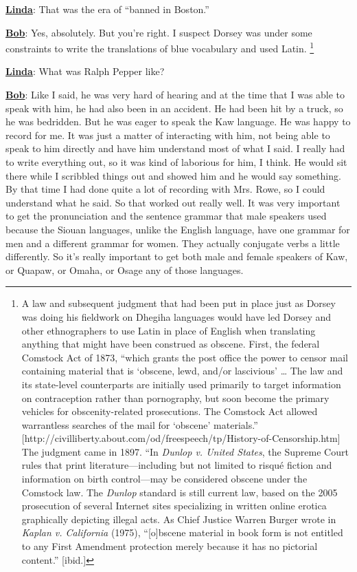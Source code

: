 \documentclass[output=paper]{LSP/langsci}
\begin{document}
\textbf{\underline{Linda}}: That was the era of ``banned in Boston.''

\textbf{\underline{Bob}}: Yes, absolutely. But you're right. I suspect Dorsey was under some constraints to write the translations of blue vocabulary and used Latin. \footnote{A law and subsequent judgment that had been put in place just as Dorsey was doing his fieldwork on Dhegiha languages would have led Dorsey and other ethnographers to use Latin in place of English when translating anything that might have been construed as obscene.  First, the federal Comstock Act of 1873, ``which grants the post office the power to censor mail containing material that is `obscene, lewd, and/or lascivious' {\ldots} The law and its state-level counterparts are initially used primarily to target information on contraception rather than pornography, but soon become the primary vehicles for obscenity-related prosecutions. The Comstock Act allowed warrantless searches of the mail for `obscene' materials.'' [{http://civilliberty.about.com/od/freespeech/tp/History-of-Censorship.htm}] The judgment came in 1897. ``In \textit{Dunlop v. United States}, the Supreme Court rules that print literature---including but not limited to risqu\'e fiction and information on birth control---may be considered obscene under the Comstock law. The \textit{Dunlop} standard is still current law, based on the 2005 prosecution of several Internet sites specializing in written online erotica graphically depicting illegal acts. As Chief Justice Warren Burger wrote in \textit{Kaplan v. California} (1975), ``[o]bscene material in book form is not entitled to any First Amendment protection merely because it has no pictorial content.''  [ibid.] }

\textbf{\underline{Linda}}: What was Ralph Pepper like?

\textbf{\underline{Bob}}: Like I said, he was very hard of hearing and at the time that I was able to speak with him, he had also been in an accident. He had been hit by a truck, so he was bedridden. But he was eager to speak the Kaw language. He was happy to record for me. It was just a matter of interacting with him, not being able to speak to him directly and have him understand most of what I said. I really had to write everything out, so it was kind of laborious for him, I think. He would sit there while I scribbled things out and showed him and he would say something. By that time I had done quite a lot of recording with Mrs. Rowe, so I could understand what he said. So that worked out really well. It was very important to get the pronunciation and the sentence grammar that male speakers used because the Siouan languages, unlike the English language, have one grammar for men and a different grammar for women. They actually conjugate verbs a little differently. So it's really important to get both male and female speakers of Kaw, or Quapaw, or Omaha, or Osage any of those languages.
\end{document}
